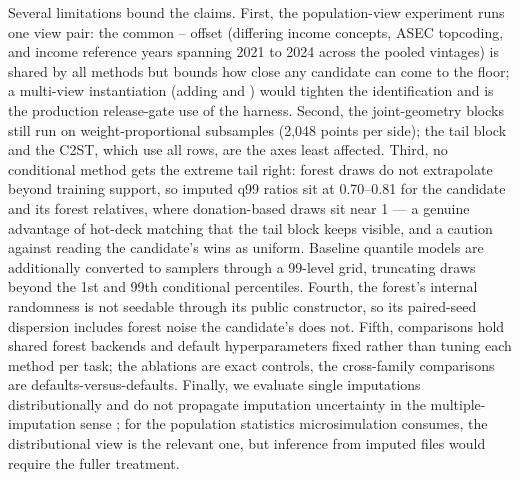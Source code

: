 Several limitations bound the claims. First, the population-view experiment
runs one view pair: the common \cps{}--\scf{} offset (differing income
concepts, ASEC topcoding, and income reference years spanning 2021 to 2024
across the pooled vintages) is shared by all methods but bounds how close any
candidate can come to the floor; a multi-view instantiation (adding \sipp{}
and \psid{}) would tighten the identification and is the production
release-gate use of the harness. Second, the joint-geometry blocks still run
on weight-proportional subsamples (2,048 points per side); the tail block and
the C2ST, which use all rows, are the axes least affected. Third, no
conditional method gets the extreme tail right: forest draws do not
extrapolate beyond training support, so imputed q99 ratios sit at 0.70--0.81
for the candidate and its forest relatives, where donation-based draws sit
near 1 --- a genuine advantage of hot-deck matching that the tail block keeps
visible, and a caution against reading the candidate's wins as uniform.
Baseline quantile models are additionally converted to samplers through a
99-level grid, truncating draws beyond the 1st and 99th conditional
percentiles. Fourth, the \microimpute{} forest's internal randomness is not
seedable through its public constructor, so its paired-seed dispersion
includes forest noise the candidate's does not. Fifth, comparisons hold
shared forest backends and default hyperparameters fixed rather than tuning
each method per task; the ablations are exact controls, the cross-family
comparisons are defaults-versus-defaults. Finally, we evaluate single
imputations distributionally and do not propagate imputation uncertainty in
the multiple-imputation sense \citep{rubin1987multiple}; for the population
statistics microsimulation consumes, the distributional view is the relevant
one, but inference from imputed files would require the fuller treatment.
